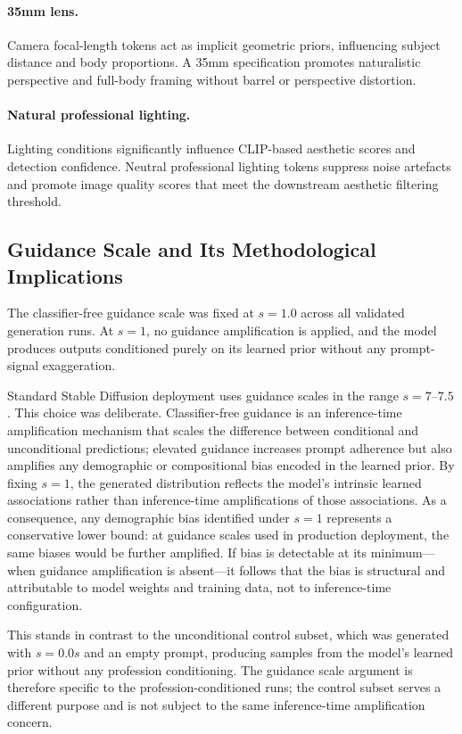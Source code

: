 \paragraph{35mm lens.}
Camera focal-length tokens act as implicit geometric priors, influencing subject distance and body proportions. A 35mm specification promotes naturalistic perspective and full-body framing without barrel or perspective distortion.

\paragraph{Natural professional lighting.}
Lighting conditions significantly influence CLIP-based aesthetic scores and detection confidence. Neutral professional lighting tokens suppress noise artefacts and promote image quality scores that meet the downstream aesthetic filtering threshold.

\subsection{Guidance Scale and Its Methodological Implications}

The classifier-free guidance scale was fixed at $s = 1.0$ across all validated generation runs. At $s = 1$, no guidance amplification is applied, and the model produces outputs conditioned purely on its learned prior without any prompt-signal exaggeration.

Standard Stable Diffusion deployment uses guidance scales in the range $s = 7$--$7.5$. This choice was deliberate. Classifier-free guidance is an inference-time amplification mechanism that scales the difference between conditional and unconditional predictions; elevated guidance increases prompt adherence but also amplifies any demographic or compositional bias encoded in the learned prior. By fixing $s = 1$, the generated distribution reflects the model's intrinsic learned associations rather than inference-time amplifications of those associations. As a consequence, any demographic bias identified under $s = 1$ represents a conservative lower bound: at guidance scales used in production deployment, the same biases would be further amplified. If bias is detectable at its minimum---when guidance amplification is absent---it follows that the bias is structural and attributable to model weights and training data, not to inference-time configuration.

This stands in contrast to the unconditional control subset, which was generated with $s = 0.0s$ and an empty prompt, producing samples from the model's learned prior without any profession conditioning. The guidance scale argument is therefore specific to the profession-conditioned runs; the control subset serves a different purpose and is not subject to the same inference-time amplification concern.

